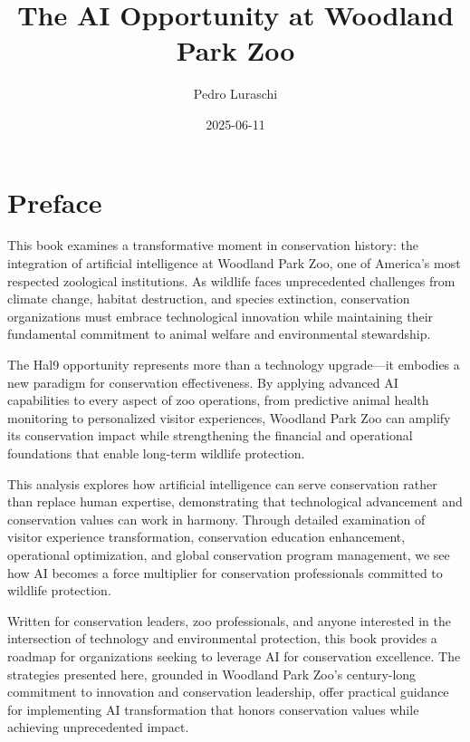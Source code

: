 \documentclass[
  Letterpaper,
]{scrbook}
\title{The AI Opportunity at Woodland Park Zoo}
\author{Pedro Luraschi}
\date{2025-06-11}
\renewcommand*\contentsname{Table of contents}
\newcommand\contentsname{Table of contents}
\begin{document}
\frontmatter
\maketitle

\renewcommand*\contentsname{Table of contents}
{
\setcounter{tocdepth}{1}
\tableofcontents
}

\mainmatter
{}

\chapter*{Preface}\label{preface}


This book examines a transformative moment in conservation history: the
integration of artificial intelligence at Woodland Park Zoo, one of
America's most respected zoological institutions. As wildlife faces
unprecedented challenges from climate change, habitat destruction, and
species extinction, conservation organizations must embrace
technological innovation while maintaining their fundamental commitment
to animal welfare and environmental stewardship.

The Hal9 opportunity represents more than a technology upgrade---it
embodies a new paradigm for conservation effectiveness. By applying
advanced AI capabilities to every aspect of zoo operations, from
predictive animal health monitoring to personalized visitor experiences,
Woodland Park Zoo can amplify its conservation impact while
strengthening the financial and operational foundations that enable
long-term wildlife protection.

This analysis explores how artificial intelligence can serve
conservation rather than replace human expertise, demonstrating that
technological advancement and conservation values can work in harmony.
Through detailed examination of visitor experience transformation,
conservation education enhancement, operational optimization, and global
conservation program management, we see how AI becomes a force
multiplier for conservation professionals committed to wildlife
protection.

Written for conservation leaders, zoo professionals, and anyone
interested in the intersection of technology and environmental
protection, this book provides a roadmap for organizations seeking to
leverage AI for conservation excellence. The strategies presented here,
grounded in Woodland Park Zoo's century-long commitment to innovation
and conservation leadership, offer practical guidance for implementing
AI transformation that honors conservation values while achieving
unprecedented impact.
\end{document}
